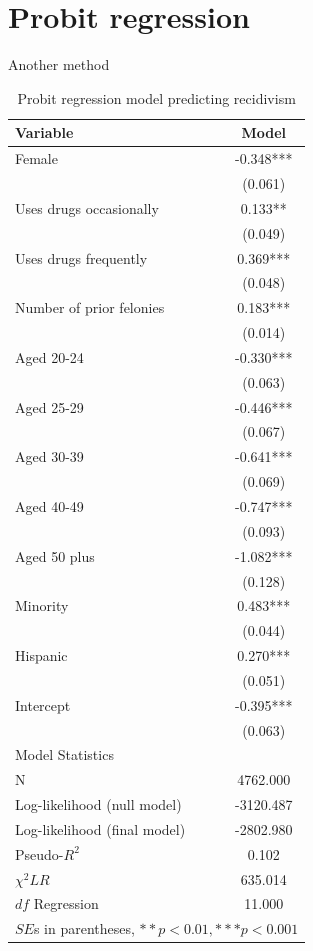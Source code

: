 \section{Probit regression}

Another method

\begin{table}[htbp]\centering
 \caption{Probit regression model predicting recidivism \label{tab:recdprob}}
\begin{tabular}{lc}
\hline
Variable      &    Model  \\
\hline
Female   &   -0.348***\\
      &   (0.061)  \\
Uses drugs occasionally   &    0.133** \\
      &   (0.049)  \\
Uses drugs frequently   &    0.369***\\
      &   (0.048)  \\
Number of prior felonies    &    0.183***\\
      &   (0.014)  \\
Aged 20-24   &   -0.330***\\
      &   (0.063)  \\
Aged 25-29   &   -0.446***\\
      &   (0.067)  \\
Aged 30-39   &   -0.641***\\
      &   (0.069)  \\
Aged 40-49   &   -0.747***\\
      &   (0.093)  \\
Aged 50 plus   &   -1.082***\\
      &   (0.128)  \\
Minority    &    0.483***\\
      &   (0.044)  \\
Hispanic     &    0.270***\\
      &   (0.051)  \\
Intercept    &   -0.395***\\
      &   (0.063)  \\
\hline
\multicolumn{1}{l}{Model Statistics} \\
\hline
N      &   4762.000  \\
Log-likelihood (null model)    &  -3120.487  \\
Log-likelihood (final model)     &  -2802.980  \\
Pseudo-$R^2$    &    0.102  \\
$\chi^2 LR$    &   635.014  \\
$df$ Regression    &    11.000  \\
\hline
\multicolumn{2}{l}{$SE$s in parentheses, $**p<0.01, ***p<0.001$} \\
\hline
\end{tabular}
\end{table}

